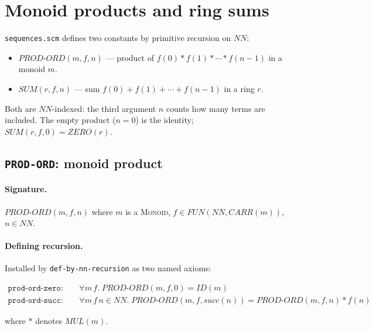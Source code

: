 \section{Monoid products and ring sums}
\label{sec:sequences}

\texttt{sequences.scm} defines two constants by primitive recursion on
$\mathit{NN}$:

\begin{itemize}
\item $\mathit{PROD\text{-}ORD}(m, f, n)$ --- product of $f(0) * f(1) * \cdots * f(n{-}1)$
  in a monoid $m$.
\item $\mathit{SUM}(r, f, n)$ --- sum $f(0) + f(1) + \cdots + f(n{-}1)$
  in a ring $r$.
\end{itemize}

Both are $\mathit{NN}$-indexed: the third argument $n$ counts how many
terms are included.  The empty product ($n = 0$) is the identity;
$\mathit{SUM}(r, f, 0) = \mathit{ZERO}(r)$.

\subsection{\texttt{PROD-ORD}: monoid product}

\paragraph{Signature.}
$\mathit{PROD\text{-}ORD}(m, f, n)$ where $m$ is a \textsc{Monoid},
$f \in \mathit{FUN}(\mathit{NN}, \mathit{CARR}(m))$, $n \in \mathit{NN}$.

\paragraph{Defining recursion.}
Installed by \texttt{def-by-nn-recursion} as two named axioms:

\begin{align*}
\mathtt{prod\text{-}ord\text{-}zero}: &\quad
  \forall m\, f.\;
  \mathit{PROD\text{-}ORD}(m, f, 0) = \mathit{ID}(m) \\
\mathtt{prod\text{-}ord\text{-}succ}: &\quad
  \forall m\, f\, n \in \mathit{NN}.\;
  \mathit{PROD\text{-}ORD}(m, f, \mathit{succ}(n))
  = \mathit{PROD\text{-}ORD}(m, f, n) * f(n)
\end{align*}

where $*$ denotes $\mathit{MUL}(m)$.

